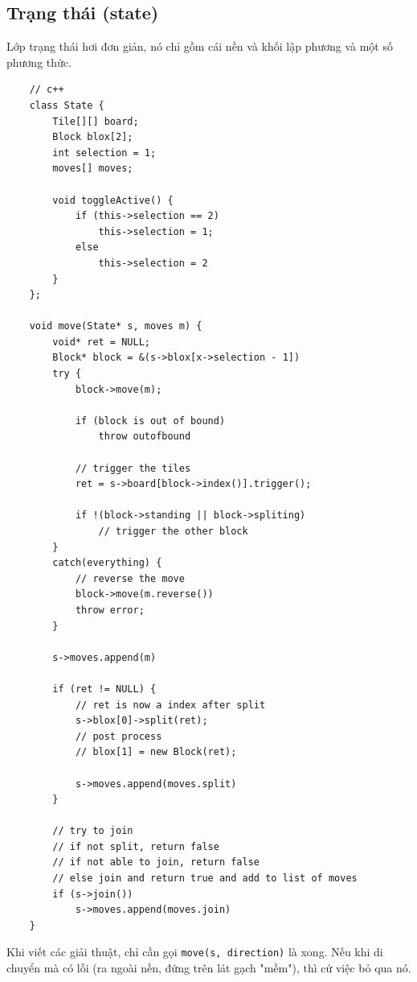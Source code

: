 \documentclass[a4paper, 11pt]{article}
\begin{document}
\subsection{Trạng thái (state)}
Lớp trạng thái hơi đơn giản, nó chỉ gồm cái nền và khối lập phương và một số phương thức.
\begin{verbatim}
    // c++
    class State {
        Tile[][] board;
        Block blox[2];
        int selection = 1;
        moves[] moves;
    
        void toggleActive() {
            if (this->selection == 2)
                this->selection = 1;
            else
                this->selection = 2
        }
    };
    
    void move(State* s, moves m) {
        void* ret = NULL;
        Block* block = &(s->blox[x->selection - 1])
        try {
            block->move(m);
    
            if (block is out of bound)
                throw outofbound
    
            // trigger the tiles
            ret = s->board[block->index()].trigger();
    
            if !(block->standing || block->spliting)
                // trigger the other block
        }
        catch(everything) {
            // reverse the move
            block->move(m.reverse())
            throw error;
        }
    
        s->moves.append(m)
    
        if (ret != NULL) {
            // ret is now a index after split
            s->blox[0]->split(ret);
            // post process
            // blox[1] = new Block(ret);
    
            s->moves.append(moves.split)
        }
    
        // try to join
        // if not split, return false
        // if not able to join, return false
        // else join and return true and add to list of moves
        if (s->join())
            s->moves.append(moves.join)
    }
\end{verbatim}
Khi viết các giải thuật, chỉ cần gọi \texttt{move(s, direction)} là xong. Nếu khi di chuyển mà có lỗi
(ra ngoài nền, đứng trên lát gạch "mềm"), thì cứ việc bỏ qua nó.
\end{document}
